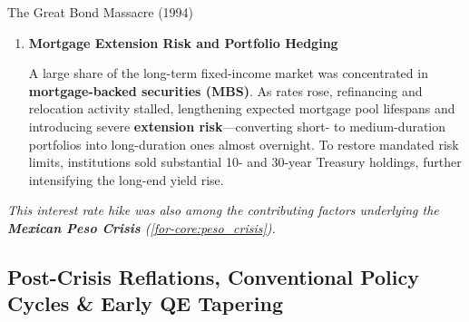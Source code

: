\documentclass[10pt]{article}
\begin{document}
\begin{core}{The Great Bond Massacre (1994)}
\begin{enumerate}
        \item \textbf{Mortgage Extension Risk and Portfolio Hedging}

        A large share of the long-term fixed-income market was concentrated in \textbf{mortgage-backed securities (MBS)}. As rates rose, refinancing and relocation activity stalled, lengthening expected mortgage pool lifespans and introducing severe \textbf{extension risk}---converting short- to medium-duration portfolios into long-duration ones almost overnight. To restore mandated risk limits, institutions sold substantial 10- and 30-year Treasury holdings, further intensifying the long-end yield rise.

      \end{enumerate}

      \textit{This interest rate hike was also among the contributing factors underlying the \textbf{Mexican Peso Crisis} (\autoref{for-core:peso_crisis}).}

    \end{core}

  \subsection{Post-Crisis Reflations, Conventional Policy Cycles \& Early QE Tapering}
\end{document}
